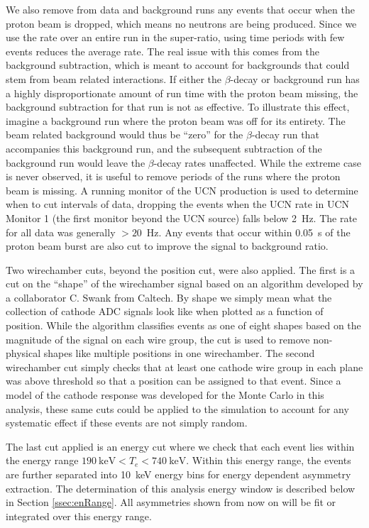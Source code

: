 We also remove from data and background runs
any events that occur when the proton beam is dropped, which means no neutrons
are being produced. Since we use the rate over an entire run in the super-ratio,
using time periods with few events reduces the average rate. The real issue with this comes
from the background subtraction, which is meant to account for backgrounds that could stem
from beam related interactions. If either the $\beta$-decay or background run has a
highly disproportionate amount of run time with the proton beam missing, the background
subtraction for that run is not as effective. To illustrate this effect, imagine a background
run where the proton beam was off for its entirety. The beam related background would thus be
``zero'' for the $\beta$-decay run that accompanies this background run, and the subsequent
subtraction of the background run would leave the $\beta$-decay rates unaffected.
While the extreme case is never observed, it is useful to remove
periods of the runs where the proton beam is missing. A running monitor of the UCN production is
used to determine when to cut intervals of data, dropping the events when the UCN rate
in UCN Monitor 1 (the first monitor beyond the UCN source) falls below 2~Hz.
The rate for all data was generally $>20$~Hz.
Any events that occur within 0.05~s of the proton beam burst are also cut to improve
the signal to background ratio.

Two wirechamber cuts, beyond the position cut, were also applied. The first is a cut on the ``shape''
of the wirechamber signal based on an algorithm developed by a collaborator C. Swank from Caltech.
By shape we simply mean what the collection of cathode ADC signals look like when plotted as a
function of position.
While the
algorithm classifies events as one of eight shapes based on the magnitude of
the signal on each wire group, the cut is used to remove non-physical shapes
like multiple positions in one wirechamber. The second wirechamber
cut simply checks that at least one cathode wire group in each plane was above threshold
so that a position can be assigned to that event.
Since a model of the cathode response was
developed for the Monte Carlo in this analysis, these same cuts could be applied to the
simulation to account for any systematic effect if these events are not simply random.

The last cut applied is an energy cut where we check that each event lies within the
energy range $190\mathrm{~keV} < T_e < 740\mathrm{~keV}$.
Within this energy range, the events are further separated into
10~keV energy bins for energy dependent asymmetry extraction. The determination
of this analysis energy window is described below in Section \ref{ssec:enRange}.
All asymmetries shown from now on
will be fit or integrated over this energy range.

